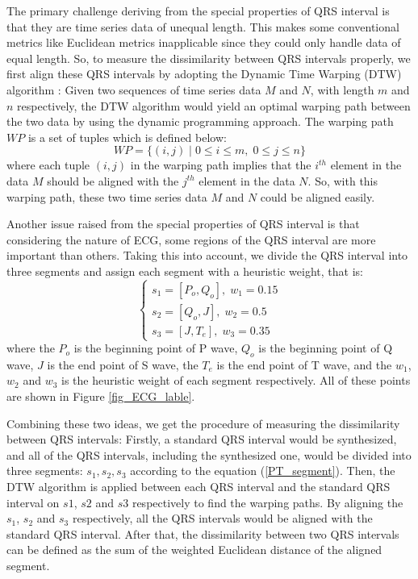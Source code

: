 \documentclass[conference]{IEEEtran}
\begin{document}
The primary challenge deriving from the special properties of QRS interval is that they are time series data of unequal length. This makes some conventional metrics like Euclidean metrics inapplicable since they could only handle data of equal length. So, to measure the dissimilarity between QRS intervals properly, we first align these QRS intervals by adopting the Dynamic Time Warping (DTW) algorithm \cite{sakoe1978dynamic}: Given two sequences of time series data $ M $ and $ N $, with length $ m $ and $ n $ respectively, the DTW algorithm would yield an optimal warping path between the two data by using the dynamic programming approach. The warping path $  WP $ is a set of tuples which is defined below:
\begin{equation}
WP = \{ (i, j) \; | \; 0 \leq i \leq m, \; 0 \leq j \leq n  \}
\end{equation}
where each tuple $ (i, j) $ in the warping path implies that the $ i^{th} $ element in the data $ M $ should be aligned with the $ j^{th} $ element in the data $ N $. So, with this warping path, these two time series data $ M $ and $ N $ could be aligned easily.


Another issue raised from the special properties of QRS interval is that considering the nature of ECG, some regions of the QRS interval are more important than others. Taking this into account, we divide the QRS interval into three segments and assign each segment with a heuristic weight, that is:
\begin{equation}\label{PT_segment}
\left\{ \begin{array}{ll}
s_1 = [P_o, Q_o], \; w_1 = 0.15\\
s_2 = [Q_o, J], \;  w_2 = 0.5\\
s_3 = [J, T_e], \; w_3 = 0.35
\end{array} \right.
\end{equation}
where the $ P_o $ is the beginning point of P wave, $ Q_o $ is the beginning point of Q wave, $ J $ is the end point of S wave, the $ T_e $ is the end point of T wave, and the $ w_1 $, $ w_2 $ and $ w_3 $ is the heuristic weight of each segment respectively. All of these points are shown in Figure \ref{fig_ECG_lable}.


Combining these two ideas, we get the procedure of measuring the dissimilarity between QRS intervals: Firstly, a standard QRS interval would be synthesized, and all of the QRS intervals, including the synthesized one, would be divided into three segments: $ s_1, s_2, s_3 $ according to the equation (\ref{PT_segment}). Then, the DTW algorithm is applied between each QRS interval and the standard QRS interval on $ s1 $, $ s2 $ and $ s3 $ respectively to find the warping paths. By aligning the $ s_1 $, $ s_2 $ and $ s_3 $ respectively, all the QRS intervals would be aligned with the standard QRS interval. After that, the dissimilarity between two QRS intervals can be defined as the sum of the weighted Euclidean distance of the aligned segment. 
\end{document}
